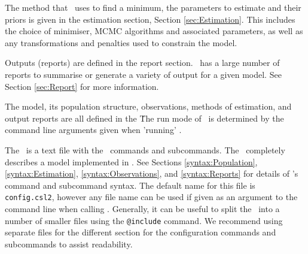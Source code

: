 The method that \CNAME\ uses to find a minimum, the parameters to estimate and their priors is given in the estimation section, Section \ref{sec:Estimation}. This includes the choice of minimiser, MCMC algorithms and associated parameters, as well as any transformations and penalties used to constrain the model.

Outputs (reports) are defined in the report section. \CNAME\ has a large number of reports to summarise or generate a variety of output for a given model. See Section \ref{sec:Report} for more information.

The model, its population structure, observations, methods of estimation, and output reports are all defined in the \config\. The run mode of \CNAME\ is determined by the command line arguments given when 'running' \CNAME.

The \config\ is a text file with the \CNAME\ commands and subcommands. The \config\ completely describes a model implemented in \CNAME. See Sections \ref{syntax:Population}, \ref{syntax:Estimation}, \ref{syntax:Observations}, and \ref{syntax:Reports} for details of \CNAME's command and subcommand syntax.  The default name for this file is \texttt{config.csl2}, however any file name can be used if given as an argument to the command line when calling \CNAME. Generally, it can be useful to split the \config\ into a number of smaller files using the \texttt{@include} command. We recommend using separate files for the different section for the configuration commands and subcommands to assist readability.

